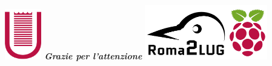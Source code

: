 \documentclass{beamer}
\begin{document}


\begin{frame}[plain]
\begin{center}
\includegraphics[width=0.12\textwidth]{imgs/logo-uniroma2-red.png}
\vfill
\huge{\textit{\textbf{Grazie per l'attenzione}}}
\vfill
\includegraphics[width=0.40\textwidth]{imgs/logo02.png}
\end{center}
\end{frame}
\end{document}
